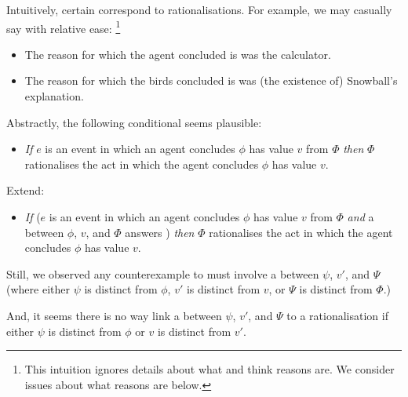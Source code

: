 \begin{note}
  Intuitively, certain \ros{} correspond to rationalisations.
  For example, we may casually say with relative ease:%
  \footnote{
    This intuition ignores details about what \citeauthor{Davidson:1963aa} and \citeauthor{Hieronymi:2011aa} think reasons are.
    We consider issues about what reasons are below.
  }

  \begin{itemize}[noitemsep]
  \item
    The reason for which the agent concluded \propM{\gistCalcEq{}} is  was the calculator.
  \item
    The reason for which the birds concluded  is  was (the existence of) Snowball's explanation.
  \end{itemize}
  Abstractly, the following conditional seems plausible:
  \begin{itemize}
  \item
    \emph{If} \(e\) is an event in which an agent concludes \(\phi\) has value \(v\) from \(\Phi\) \emph{then} \(\Phi\) rationalises the act in which the agent concludes \(\phi\) has value \(v\).
  \end{itemize}
  Extend:
  \begin{itemize}
  \item
    \emph{If} (\(e\) is an event in which an agent concludes \(\phi\) has value \(v\) from \(\Phi\) \emph{and} a \ros{} between \(\phi\), \(v\), and \(\Phi\) answers \qWhy{}) \emph{then} \(\Phi\) rationalises the act in which the agent concludes \(\phi\) has value \(v\).
  \end{itemize}
  Still, we observed any counterexample to \issueInclusion{} must involve a \ros{} between \(\psi\), \(v'\), and \(\Psi\) (where either \(\psi\) is distinct from \(\phi\), \(v'\) is distinct from \(v\), or \(\Psi\) is distinct from \(\Phi\).)

  And, it seems there is no way link a \ros{} between \(\psi\), \(v'\), and \(\Psi\) to a rationalisation if either \(\psi\) is distinct from \(\phi\) or \(v\) is distinct from \(v'\).


\end{note}
